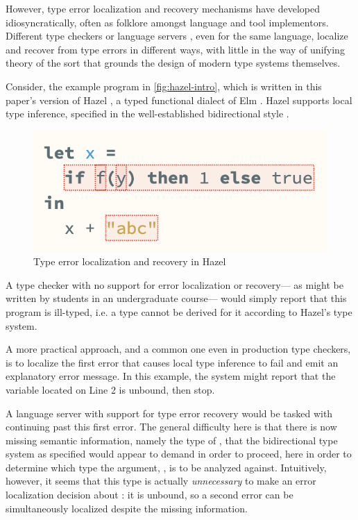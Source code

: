 However, type error localization and recovery mechanisms have developed idiosyncratically, 
often as folklore amongst language and tool implementors. 
Different type checkers or language servers \cite{langauge-servers,merlin}, even for the same language, localize and recover from type errors in different ways, 
with little in the way of unifying theory of the sort that grounds the design of modern type systems themselves.

Consider, the example program in \autoref{fig:hazel-intro}, which is written in
this paper's version of Hazel \cite{hazel}, a typed functional dialect of Elm \cite{elm}. Hazel  
supports local type inference, specified in the well-established bidirectional style \cite{pierce,hazelnut,BidirTyping}.
\begin{figure}
    \includegraphics[scale=0.5]{images/hazel-intro-screenshot.png}
    \caption{Type error localization and recovery in Hazel}
    \label{fig:hazel-intro}
\end{figure}

A type checker with no support for error localization or recovery---%
as might be written by students in an undergraduate course---%
would simply report that this program is ill-typed, 
i.e. a type cannot be derived for it according to Hazel's type system. 

A more practical approach, and a common one even in production type checkers, 
is to localize the first error that causes local type inference to fail and emit an explanatory error message.
In this example, the system might report that the variable  located on Line 2 is unbound, then stop.

A language server with support for type error recovery would 
 be tasked with continuing past this first error.
 The general difficulty here is that there is now missing semantic information, namely the type of , that 
 the bidirectional type system as specified 
 would appear to demand in order to proceed, here in order to determine which type the argument, , is to be analyzed against.
 Intuitively, however, it seems that this type is actually \emph{unnecessary} to make an error localization decision about : 
it is unbound, so a second error can be simultaneously localized despite the missing information.

